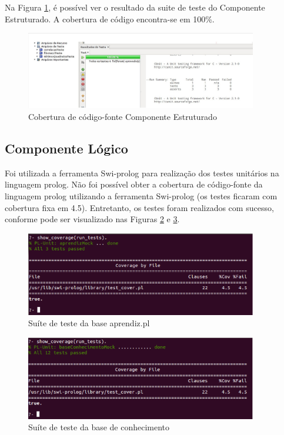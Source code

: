 Na Figura \ref{testeC}, é possível ver o resultado da suite de teste do Componente Estruturado. A cobertura de código encontra-se em 100\%.

\begin{figure}[H]
\centering
\includegraphics[width=0.9\textwidth]{figuras/testeC}
\caption{Cobertura de código-fonte Componente Estruturado}
\label{testeC}
\end{figure}

\subsection{Componente Lógico}
Foi utilizada a ferramenta Swi-prolog para realização dos testes unitários na linguagem prolog. Não foi possível obter a cobertura de código-fonte da linguagem prolog utilizando a ferramenta Swi-prolog (os testes ficaram com cobertura fixa em 4.5). Entretanto, os testes foram realizados com sucesso, conforme pode ser visualizado nas Figuras \ref{prologTeste1} e \ref{prologTeste2}. 

\begin{figure}[H]
\centering
\includegraphics[width=0.9\textwidth]{figuras/prologTeste1}
\caption{Suíte de teste da base aprendiz.pl}
\label{prologTeste1}
\end{figure}

\begin{figure}[H]
\centering
\includegraphics[width=0.9\textwidth]{figuras/prologTeste2}
\caption{Suíte de teste da base de conhecimento}
\label{prologTeste2}
\end{figure}

